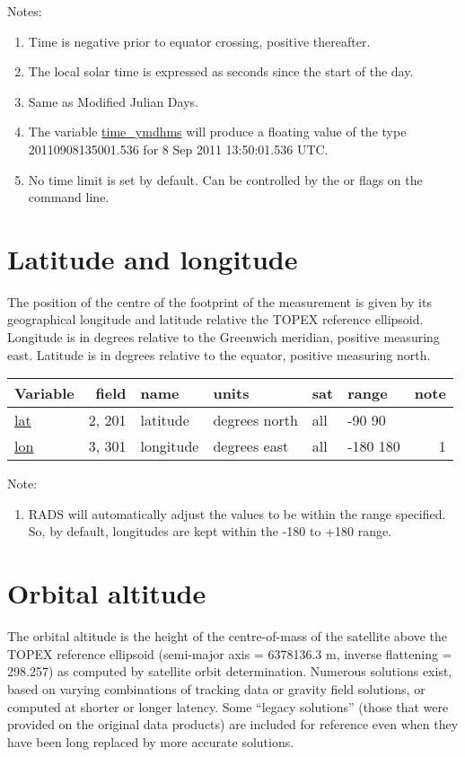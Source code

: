 \documentclass[a4paper,11pt,openany,natbib]{thesis}
\makeatletter
\newcommand\var[1]{\url{#1}\index{variables!#1@\protect\url{#1}}}
\newenvironment{vartable}{
\begin{table}[ht]
\small
\begin{tabular}{lrllllr}
\hline
Variable & field & name & units & sat & range & note \\
\hline
}{
\hline
\end{tabular}
\end{table}
}
\makeatother
\begin{document}
Notes:
\begin{enumerate}
\item Time is negative prior to equator crossing, positive thereafter.
\item The local solar time is expressed as seconds since the start of the day.
\item Same as Modified Julian Days.
\item The variable \var{time_ymdhms} will produce a floating value of the type 20110908135001.536 for 8 Sep 2011 13:50:01.536 UTC.
\item No time limit is set by default. Can be controlled by the  or  flags on the command line.
\end{enumerate}

\section{Latitude and longitude}
The position of the centre of the footprint of the measurement is given by its geographical longitude and latitude relative the TOPEX reference ellipsoid. Longitude is in degrees relative to the Greenwich meridian, positive measuring east. Latitude is in degrees relative to the equator, positive measuring north. 

\begin{vartable}
\var{lat} & 2, 201 & latitude & degrees north & all & -90 90 & \\
\var{lon} & 3, 301 & longitude & degrees east & all & -180 180 & 1 \\
\end{vartable}
Note:
\begin{enumerate}
\item RADS will automatically adjust the values to be within the range specified. So, by default, longitudes are kept within the -180 to +180 range.
\end{enumerate}

\section{Orbital altitude}\label{var:alt}
The orbital altitude is the height of the centre-of-mass of the satellite above the TOPEX reference ellipsoid (semi-major axis = 6378136.3 m, inverse flattening = 298.257) as computed by satellite orbit determination. Numerous solutions exist, based on varying combinations of tracking data or gravity field solutions, or computed at shorter or longer latency. Some ``legacy solutions'' (those that were provided on the original data products) are included for reference even when they have been long replaced by more accurate solutions.
\end{document}
